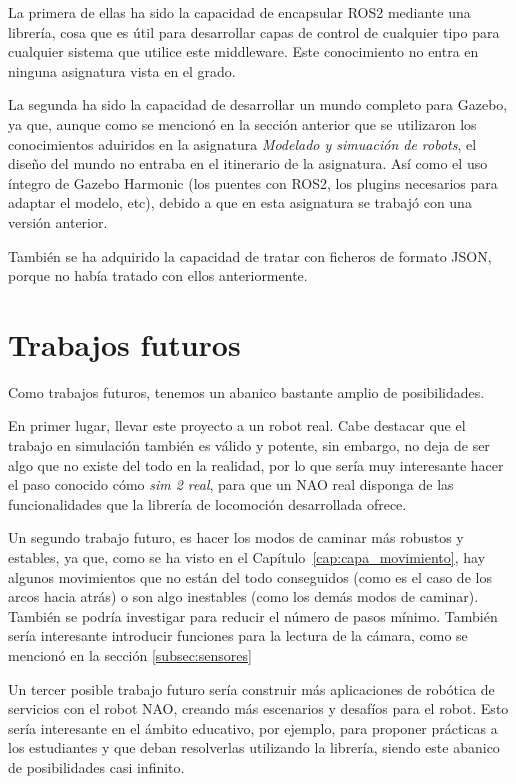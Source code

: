 La primera de ellas ha sido la capacidad de encapsular ROS2 mediante una librería, cosa que es útil para desarrollar capas de control de cualquier tipo para cualquier sistema que utilice este middleware. Este conocimiento no entra en ninguna asignatura vista en el grado.

La segunda ha sido la capacidad de desarrollar un mundo completo para Gazebo, ya que, aunque como se mencionó en la sección anterior que se utilizaron los conocimientos aduiridos en la asignatura \textit{Modelado y simuación de robots}, el diseño del mundo no entraba en el itinerario de la asignatura. Así como el uso íntegro de Gazebo Harmonic (los puentes con ROS2, los plugins necesarios para adaptar el modelo, etc), debido a que en esta asignatura se trabajó con una versión anterior.

También se ha adquirido la capacidad de tratar con ficheros de formato JSON, porque no había tratado con ellos anteriormente.

\section{Trabajos futuros}

Como trabajos futuros, tenemos un abanico bastante amplio de posibilidades.

En primer lugar, llevar este proyecto a un robot real. Cabe destacar que el trabajo en simulación también es válido y potente, sin embargo, no deja de ser algo que no existe del todo en la realidad, por lo que sería muy interesante hacer el paso conocido cómo \textit{sim 2 real}, para que un NAO real disponga de las funcionalidades que la librería de locomoción desarrollada ofrece.

Un segundo trabajo futuro, es hacer los modos de caminar más robustos y estables, ya que, como se ha visto en el Capítulo~\ref{cap:capa_movimiento}, hay algunos movimientos que no están del todo conseguidos (como es el caso de los arcos hacia atrás) o son algo inestables (como los demás modos de caminar). También se podría investigar para reducir el número de pasos mínimo. También sería interesante introducir funciones para la lectura de la cámara, como se mencionó en la sección \ref{subsec:sensores}

Un tercer posible trabajo futuro sería construir más aplicaciones de robótica de servicios con el robot NAO, creando más escenarios y desafíos para el robot. Esto sería interesante en el ámbito educativo, por ejemplo, para proponer prácticas a los estudiantes y que deban resolverlas utilizando la librería, siendo este abanico de posibilidades casi infinito.
